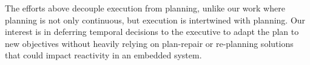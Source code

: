 The efforts above decouple execution from planning, unlike our work
where planning is not only continuous, but execution is intertwined
with planning. Our interest is in deferring temporal decisions to the
executive to adapt the plan to new objectives without heavily relying
on plan-repair or re-planning solutions that could impact reactivity
in an embedded system.




